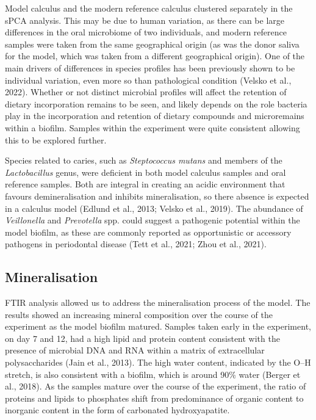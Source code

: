 \documentclass[
]{article}
\begin{document}
Model calculus and the modern reference calculus clustered separately in
the sPCA analysis. This may be due to human variation, as there can be
large differences in the oral microbiome of two individuals, and modern
reference samples were taken from the same geographical origin (as was
the donor saliva for the model, which was taken from a different
geographical origin). One of the main drivers of differences in species
profiles has been previously shown to be individual variation, even more
so than pathological condition (Velsko et al., 2022). Whether or not
distinct microbial profiles will affect the retention of dietary
incorporation remains to be seen, and likely depends on the role
bacteria play in the incorporation and retention of dietary compounds
and microremains within a biofilm. Samples within the experiment were
quite consistent allowing this to be explored further.

Species related to caries, such as \emph{Steptococcus mutans} and
members of the \emph{Lactobacillus} genus, were deficient in both model
calculus samples and oral reference samples. Both are integral in
creating an acidic environment that favours demineralisation and
inhibits mineralisation, so there absence is expected in a calculus
model (Edlund et al., 2013; Velsko et al., 2019). The abundance of
\emph{Veillonella} and \emph{Prevotella} spp. could suggest a pathogenic
potential within the model biofilm, as these are commonly reported as
opportunistic or accessory pathogens in periodontal disease (Tett et
al., 2021; Zhou et al., 2021).

\hypertarget{mineralisation}{%
\subsection{Mineralisation}\label{mineralisation}}

FTIR analysis allowed us to address the mineralisation process of the
model. The results showed an increasing mineral composition over the
course of the experiment as the model biofilm matured. Samples taken
early in the experiment, on day 7 and 12, had a high lipid and protein
content consistent with the presence of microbial DNA and RNA within a
matrix of extracellular polysaccharides (Jain et al., 2013). The high
water content, indicated by the O--H stretch, is also consistent with a
biofilm, which is around 90\% water (Berger et al., 2018). As the
samples mature over the course of the experiment, the ratio of proteins
and lipids to phosphates shift from predominance of organic content to
inorganic content in the form of carbonated hydroxyapatite.
\end{document}
